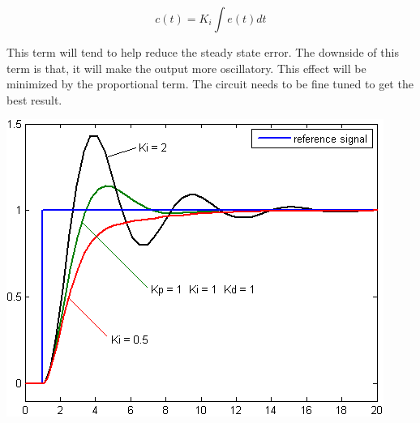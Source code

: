 \begin{multicols}{2}
$$c(t)=K_i\int e(t) d t$$

This term will tend to help reduce the steady state error. The downside of this term is that, it will make the output more oscillatory. This effect will be minimized by the proportional term. The circuit needs to be fine tuned to get the best result.


\begin{minipage}{0.45\textwidth}
\centering
\includegraphics[width=\textwidth]{PID/Change_with_Ki.png}
\end{minipage}


\end{multicols}

